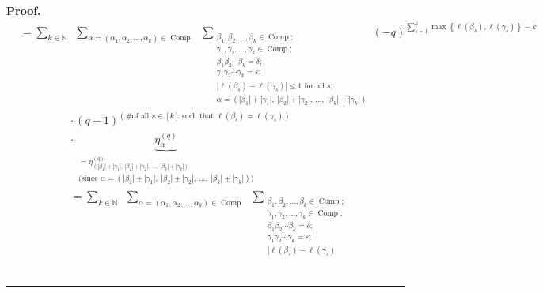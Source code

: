 \documentclass[numbers=enddot,12pt,final,onecolumn,notitlepage]{scrartcl}%
\theoremstyle{definition}
\newenvironment{proof}[1][Proof]{\noindent\textbf{#1.} }{\ \rule{0.5em}{0.5em}}
\let\sumnonlimits\sum
\renewcommand{\sum}{\sumnonlimits\limits}
\begin{document}
\begin{proof}
\begin{align*}
&  =\sum_{k\in\mathbb{N}}\ \ \sum_{\alpha=\left(  \alpha_{1},\alpha_{2}%
,\ldots,\alpha_{k}\right)  \in\operatorname*{Comp}}\ \ \sum_{\substack{\beta
_{1},\beta_{2},\ldots,\beta_{k}\in\operatorname*{Comp};\\\gamma_{1},\gamma
_{2},\ldots,\gamma_{k}\in\operatorname*{Comp};\\\beta_{1}\beta_{2}\cdots
\beta_{k}=\delta;\\\gamma_{1}\gamma_{2}\cdots\gamma_{k}=\varepsilon
;\\\left\vert \ell\left(  \beta_{s}\right)  -\ell\left(  \gamma_{s}\right)
\right\vert \leq1\text{ for all }s;\\\alpha=\left(  \left\vert \beta
_{1}\right\vert +\left\vert \gamma_{1}\right\vert ,\ \left\vert \beta
_{2}\right\vert +\left\vert \gamma_{2}\right\vert ,\ \ldots,\ \left\vert
\beta_{k}\right\vert +\left\vert \gamma_{k}\right\vert \right)  }}\left(
-q\right)  ^{\sum_{s=1}^{k}\max\left\{  \ell\left(  \beta_{s}\right)
,\ell\left(  \gamma_{s}\right)  \right\}  -k}\\
&  \ \ \ \ \ \ \ \ \ \ \ \ \ \ \ \ \ \ \ \ \cdot\left(  q-1\right)  ^{\left(
\text{\# of all }s\in\left[  k\right]  \text{ such that }\ell\left(  \beta
_{s}\right)  =\ell\left(  \gamma_{s}\right)  \right)  }\\
&  \ \ \ \ \ \ \ \ \ \ \ \ \ \ \ \ \ \ \ \ \cdot\underbrace{\eta_{\alpha
}^{\left(  q\right)  }}_{\substack{=\eta_{\left(  \left\vert \beta
_{1}\right\vert +\left\vert \gamma_{1}\right\vert ,\ \left\vert \beta
_{2}\right\vert +\left\vert \gamma_{2}\right\vert ,\ \ldots,\ \left\vert
\beta_{k}\right\vert +\left\vert \gamma_{k}\right\vert \right)  }^{\left(
q\right)  }\\\text{(since }\alpha=\left(  \left\vert \beta_{1}\right\vert
+\left\vert \gamma_{1}\right\vert ,\ \left\vert \beta_{2}\right\vert
+\left\vert \gamma_{2}\right\vert ,\ \ldots,\ \left\vert \beta_{k}\right\vert
+\left\vert \gamma_{k}\right\vert \right)  \text{)}}}
\end{align*}%
\begin{align}
&  =\sum_{k\in\mathbb{N}}\ \ \sum_{\alpha=\left(  \alpha_{1},\alpha_{2}%
,\ldots,\alpha_{k}\right)  \in\operatorname*{Comp}}\ \ \sum_{\substack{\beta
_{1},\beta_{2},\ldots,\beta_{k}\in\operatorname*{Comp};\\\gamma_{1},\gamma
_{2},\ldots,\gamma_{k}\in\operatorname*{Comp};\\\beta_{1}\beta_{2}\cdots
\beta_{k}=\delta;\\\gamma_{1}\gamma_{2}\cdots\gamma_{k}=\varepsilon
;\\\left\vert \ell\left(  \beta_{s}\right)  -\ell\left(  \gamma_{s}\right)
}}
\end{align}
\end{proof}
\end{document}
